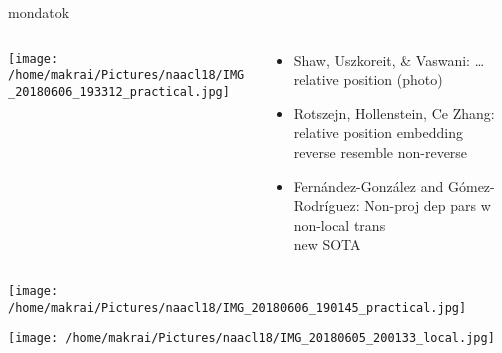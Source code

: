 \documentclass{beamer}
\begin{document}
    \begin{frame}{mondatok}
      \begin{columns}\begin{column}{.35\textwidth}\centering \texttt{[image: /home/makrai/Pictures/naacl18/IMG\_20180606\_193312\_practical.jpg]}\end{column}\begin{column}{.65\textwidth}
        \begin{itemize}
          \item Shaw, Uszkoreit, \& Vaswani: \dots \alert{relative position} (photo)
          \item Rotszejn, Hollenstein, Ce Zhang: relative position embedding
            \\ reverse resemble non-reverse
          \item Fernández-González and Gómez-Rodríguez: Non-proj dep pars w non-local trans 
            \\ new SOTA
        \end{itemize}
    \end{column} \end{columns}
  \end{frame}

  \begin{frame}[allowframebreaks]
\texttt{[image: /home/makrai/Pictures/naacl18/IMG\_20180606\_190145\_practical.jpg]} 

    \texttt{[image: /home/makrai/Pictures/naacl18/IMG\_20180605\_200133\_local.jpg]}
  \end{frame}

\end{document}
